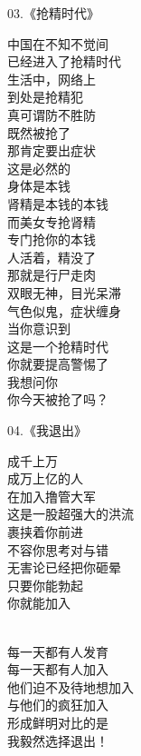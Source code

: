 \begin{multicols}{2}
    \begin{center}
        03.《抢精时代》\it

        中国在不知不觉间 \\ 已经进入了抢精时代 \\ 生活中，网络上 \\ 到处是抢精犯 \\ 真可谓防不胜防 \\ 既然被抢了 \\ 那肯定要出症状 \\ 这是必然的 \\ 身体是本钱 \\ 肾精是本钱的本钱 \\ 而美女专抢肾精 \\ 专门抢你的本钱 \\ 人活着，精没了 \\ 那就是行尸走肉 \\ 双眼无神，目光呆滞 \\ 气色似鬼，症状缠身 \\ 当你意识到 \\ 这是一个抢精时代 \\ 你就要提高警惕了 \\ 我想问你 \\ 你今天被抢了吗？
    \end{center}

    \begin{center}
        04.《我退出》\it

        成千上万 \\ 成万上亿的人 \\ 在加入撸管大军 \\ 这是一股超强大的洪流 \\ 裹挟着你前进 \\ 不容你思考对与错 \\ 无害论已经把你砸晕 \\ 只要你能勃起 \\ 你就能加入

        ~\\

        每一天都有人发育 \\ 每一天都有人加入 \\ 他们迫不及待地想加入 \\ 与他们的疯狂加入 \\ 形成鲜明对比的是 \\ 我毅然选择退出！

        ~\\


\end{center}
\end{multicols}
